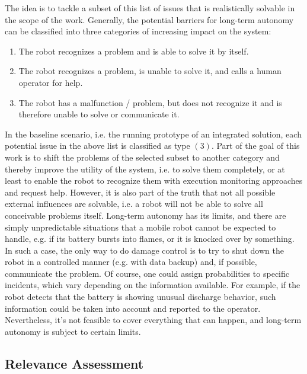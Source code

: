 \documentclass[english, master, utf8]{base/thesis_KBS}
\begin{document}
\noindent
The idea is to tackle a subset of this list of issues that is realistically solvable in the scope of the work.
Generally, the potential barriers for long-term autonomy can be classified into three categories of increasing impact on the system:
\begin{enumerate}
    \item The robot recognizes a problem and is able to solve it by itself.
    \item The robot recognizes a problem, is unable to solve it, and calls a human operator for help.
    \item The robot has a malfunction / problem, but does not recognize it and is therefore unable to solve or communicate it.
\end{enumerate}
In the baseline scenario, i.e. the running prototype of an integrated solution, each potential issue in the above list is classified as type $(3)$.
Part of the goal of this work is to shift the problems of the selected subset to another category and thereby improve the utility of the system, 
i.e. to solve them completely, or at least to enable the robot to recognize them with execution monitoring approaches and request help.
However, it is also part of the truth that not all possible external influences are solvable, i.e. a robot will not be able to solve all
conceivable problems itself. Long-term autonomy has its limits, and there are simply unpredictable situations that a mobile robot cannot be expected to handle,
e.g. if its battery bursts into flames, or it is knocked over by something. In such a case, the only way to do damage control is to try to shut down the 
robot in a controlled manner (e.g. with data backup) and, if possible, communicate the problem.
Of course, one could assign probabilities to specific incidents, which vary depending on the information available. 
For example, if the robot detects that the battery is showing unusual discharge behavior, such information could be taken into account and 
reported to the operator. Nevertheless, it's not feasible to cover everything that can happen, and long-term autonomy is subject to certain limits.

\subsection{Relevance Assessment}
\label{sec:relevance_assessment}
\end{document}

